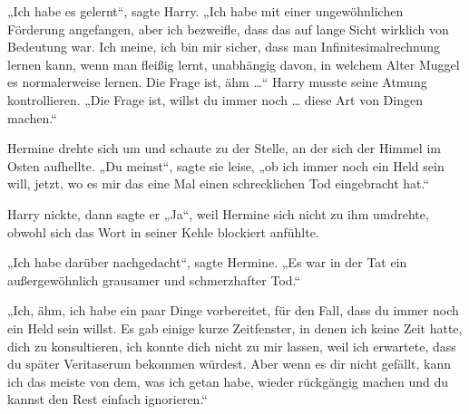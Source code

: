 „Ich habe es gelernt“, sagte Harry.
„Ich habe mit einer ungewöhnlichen Förderung angefangen, aber ich bezweifle, dass das auf lange Sicht wirklich von Bedeutung war. Ich meine, ich bin mir sicher, dass man Infinitesimalrechnung lernen kann, wenn man fleißig lernt, unabhängig davon, in welchem Alter Muggel es normalerweise lernen. Die Frage ist, ähm …“ Harry musste seine Atmung kontrollieren.
„Die Frage ist, willst du immer noch … diese Art von Dingen machen.“

Hermine drehte sich um und schaute zu der Stelle, an der sich der Himmel im Osten aufhellte.
„Du meinst“, sagte sie leise, „ob ich immer noch ein Held sein will, jetzt, wo es mir das eine Mal einen schrecklichen Tod eingebracht hat.“

Harry nickte, dann sagte er
„Ja“, weil Hermine sich nicht zu ihm umdrehte, obwohl sich das Wort in seiner Kehle blockiert anfühlte.

„Ich habe darüber nachgedacht“, sagte Hermine.
„Es war in der Tat ein außergewöhnlich grausamer und schmerzhafter Tod.“

„Ich, ähm, ich habe ein paar Dinge vorbereitet, für den Fall, dass du immer noch ein Held sein willst. Es gab einige kurze Zeitfenster, in denen ich keine Zeit hatte, dich zu konsultieren, ich konnte dich nicht zu mir lassen, weil ich erwartete, dass du später Veritaserum bekommen würdest. Aber wenn es dir nicht gefällt, kann ich das meiste von dem, was ich getan habe, wieder rückgängig machen und du kannst den Rest einfach ignorieren.“

